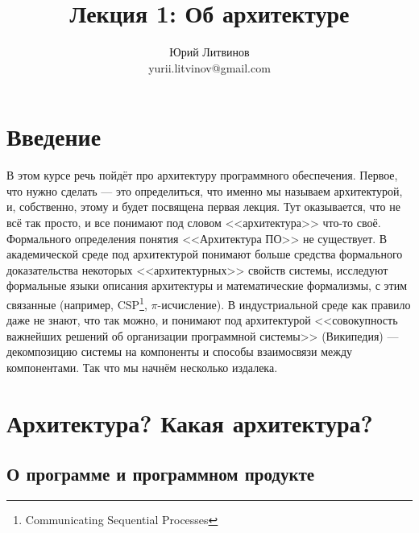 \documentclass[a5paper]{article}
\title{Лекция 1: Об архитектуре}
\author{Юрий Литвинов\\\small{yurii.litvinov@gmail.com}}
\date{}
\begin{document}
\maketitle
\thispagestyle{empty}

\section{Введение}

В этом курсе речь пойдёт про архитектуру программного обеспечения. Первое, что нужно сделать --- это определиться, что именно мы называем архитектурой, и, собственно, этому и будет посвящена первая лекция. Тут оказывается, что не всё так просто, и все понимают под словом <<архитектура>> что-то своё. Формального определения понятия <<Архитектура ПО>> не существует. В академической среде под архитектурой понимают больше средства формального доказательства некоторых <<архитектурных>> свойств системы, исследуют формальные языки описания архитектуры и математические формализмы, с этим связанные (например, CSP\footnote{Communicating Sequential Processes}, $\pi$-исчисление). В индустриальной среде как правило даже не знают, что так можно, и понимают под архитектурой <<совокупность важнейших решений об организации программной системы>> (\textcopyright Википедия) --- декомпозицию системы на компоненты и способы взаимосвязи между компонентами. Так что мы начнём несколько издалека.

\section{Архитектура? Какая архитектура?}

\subsection{О программе и программном продукте}
\end{document}
